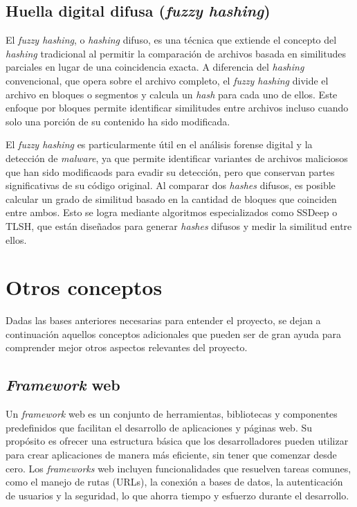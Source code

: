 \subsection{Huella digital difusa (\textit{fuzzy hashing})}

El \textit{fuzzy hashing}, o \textit{hashing} difuso, es una técnica que extiende el concepto del \textit{hashing} tradicional al permitir la comparación de archivos basada en similitudes parciales en lugar de una coincidencia exacta. A diferencia del \textit{hashing} convencional, que opera sobre el archivo completo, el \textit{fuzzy hashing} divide el archivo en bloques o segmentos y calcula un \textit{hash} para cada uno de ellos. Este enfoque por bloques permite identificar similitudes entre archivos incluso cuando solo una porción de su contenido ha sido modificada.

El \textit{fuzzy hashing} es particularmente útil en el análisis forense digital y la detección de \textit{malware}, ya que permite identificar variantes de archivos maliciosos que han sido modificaods para evadir su detección, pero que conservan partes significativas de su código original. Al comparar dos \textit{hashes} difusos, es posible calcular un grado de similitud basado en la cantidad de bloques que coinciden entre ambos. Esto se logra mediante algoritmos especializados como SSDeep o TLSH, que están diseñados para generar \textit{hashes} difusos y medir la similitud entre ellos.

\section{Otros conceptos}

Dadas las bases anteriores necesarias para entender el proyecto, se dejan a continuación aquellos conceptos adicionales que pueden ser de gran ayuda para comprender mejor otros aspectos relevantes del proyecto.

\subsection{\textit{Framework} web}

Un \textit{framework} web es un conjunto de herramientas, bibliotecas y componentes predefinidos que facilitan el desarrollo de aplicaciones y páginas web. Su propósito es ofrecer una estructura básica que los desarrolladores pueden utilizar para crear aplicaciones de manera más eficiente, sin tener que comenzar desde cero. Los \textit{frameworks} web incluyen funcionalidades que resuelven tareas comunes, como el manejo de rutas (URLs), la conexión a bases de datos, la autenticación de usuarios y la seguridad, lo que ahorra tiempo y esfuerzo durante el desarrollo.

